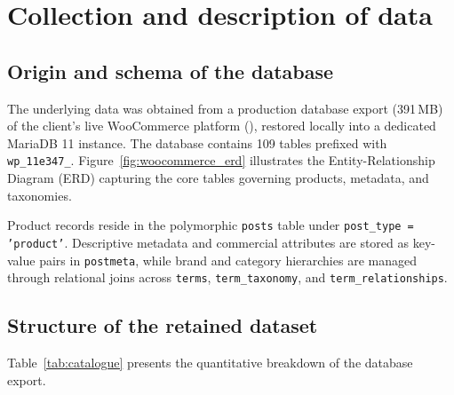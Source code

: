 
\section{Collection and description of data}

\subsection{Origin and schema of the database}

The underlying data was obtained from a production database export (391\,MB) of the client's live WooCommerce platform (\clientsite), restored locally into a dedicated MariaDB 11 instance. The database contains 109 tables prefixed with \texttt{wp\_11e347\_}. Figure~\ref{fig:woocommerce_erd} illustrates the Entity-Relationship Diagram (ERD) capturing the core tables governing products, metadata, and taxonomies.


Product records reside in the polymorphic \texttt{posts} table under \texttt{post\_type = 'product'}. Descriptive metadata and commercial attributes are stored as key-value pairs in \texttt{postmeta}, while brand and category hierarchies are managed through relational joins across \texttt{terms}, \texttt{term\_taxonomy}, and \texttt{term\_relationships}.

\subsection{Structure of the retained dataset}

Table~\ref{tab:catalogue} presents the quantitative breakdown of the database export.

